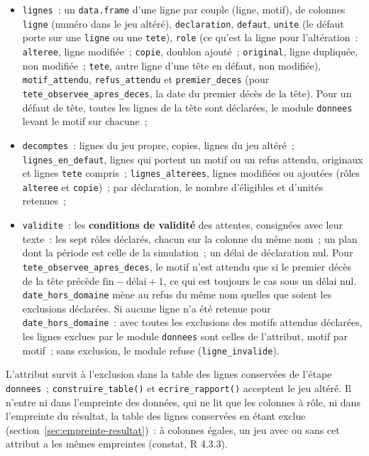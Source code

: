 \documentclass[a4paper,11pt]{article}
\newcommand{\code}[1]{\texttt{\small #1}}
\begin{document}
\begin{itemize}[leftmargin=*, itemsep=2pt]
  \item \code{lignes}~: un \code{data.frame} d'une ligne par couple (ligne,
    motif), de colonnes \code{ligne} (numéro dans le jeu altéré),
    \code{declaration}, \code{defaut}, \code{unite} (le défaut porte sur une
    \code{ligne} ou une \code{tete}), \code{role} (ce qu'est la ligne pour
    l'altération~: \code{alteree}, ligne modifiée~; \code{copie}, doublon
    ajouté~; \code{original}, ligne dupliquée, non modifiée~; \code{tete},
    autre ligne d'une tête en défaut, non modifiée), \code{motif\_attendu},
    \code{refus\_attendu} et \code{premier\_deces} (pour
    \code{tete\_observee\_apres\_deces}, la date du premier décès de la
    tête). Pour un défaut de tête, toutes les lignes de la tête sont
    déclarées, le module \code{donnees} levant le motif sur chacune~;
  \item \code{decomptes}~: lignes du jeu propre, copies, lignes du jeu
    altéré~; \code{lignes\_en\_defaut}, lignes qui portent un motif ou un
    refus attendu, originaux et lignes \code{tete} compris~;
    \code{lignes\_alterees}, lignes modifiées ou ajoutées (rôles
    \code{alteree} et \code{copie})~; par déclaration, le nombre
    d'éligibles et d'unités retenues~;
  \item \code{validite}~: les \textbf{conditions de validité} des attentes,
    consignées avec leur texte~: les sept rôles déclarés, chacun sur la
    colonne du même nom~; un plan dont la période est celle de la
    simulation~; un délai de déclaration nul. Pour
    \code{tete\_observee\_apres\_deces}, le motif n'est attendu que si le
    premier décès de la tête précède $\text{fin} - \text{délai} + 1$, ce
    qui est toujours le cas sous un délai nul. \code{date\_hors\_domaine}
    mène au refus du même nom quelles que soient les exclusions déclarées.
    Si aucune ligne n'a été retenue pour \code{date\_hors\_domaine}~: avec
    toutes les exclusions des motifs attendus déclarées, les lignes exclues
    par le module \code{donnees} sont celles de l'attribut, motif par
    motif~; sans exclusion, le module refuse (\code{ligne\_invalide}).
\end{itemize}

\noindent
L'attribut survit à l'exclusion dans la table des lignes conservées de
l'étape \code{donnees}~; \code{construire\_table()} et
\code{ecrire\_rapport()} acceptent le jeu altéré. Il n'entre ni dans
l'empreinte des données, qui ne lit que les colonnes à rôle, ni dans
l'empreinte du résultat, la table des lignes conservées en étant exclue
(section~\ref{sec:empreinte-resultat})~: à colonnes égales, un jeu avec ou
sans cet attribut a les mêmes empreintes (constat, R 4.3.3).
\end{document}
